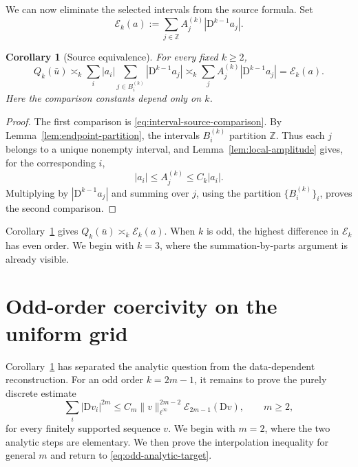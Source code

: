 \documentclass[11pt]{amsart}
\theoremstyle{plain}
\newtheorem{corollary}[theorem]{Corollary}
\theoremstyle{definition}
\theoremstyle{remark}
\numberwithin{equation}{section}
\theoremstyle{plain}
\begin{document}
We can now eliminate the selected intervals from the source formula.  Set
\begin{equation}\label{eq:finite-difference-source-functional}
	\mathcal E_k(a)
	:=\sum_{j\in\mathbb Z}
	A_j^{(k)}|\mathrm D^{k-1}a_j|.
\end{equation}

\begin{corollary}[Source equivalence]
	\label{cor:source-equivalence}
	For every fixed $k\ge2$,
	\begin{equation}\label{eq:source-functional-equivalence}
		Q_k(\bar u)
		\asymp_k
		\sum_i|a_i|\sum_{j\in B_i^{(k)}}
		|\mathrm D^{k-1}a_j|
		\asymp_k
		\sum_j A_j^{(k)}|\mathrm D^{k-1}a_j|
		=\mathcal E_k(a).
	\end{equation}
	Here the comparison constants depend only on $k$.
\end{corollary}

\begin{proof}
	The first comparison is \eqref{eq:interval-source-comparison}.  By
	Lemma~\ref{lem:endpoint-partition}, the intervals $B_i^{(k)}$ partition
	$\mathbb Z$.  Thus each $j$ belongs to a unique nonempty interval, and
	Lemma~\ref{lem:local-amplitude} gives, for the corresponding $i$,
	\[
	|a_i|\le A_j^{(k)}\le C_k|a_i|.
	\]
	Multiplying by $|\mathrm D^{k-1}a_j|$ and summing over $j$, using the
	partition $\{B_i^{(k)}\}_i$, proves the second comparison.
\end{proof}

Corollary~\ref{cor:source-equivalence} gives
$Q_k(\bar u)\asymp_k\mathcal E_k(a)$.  When $k$ is odd, the highest
difference in $\mathcal E_k$ has even order.  We begin with $k=3$, where the
summation-by-parts argument is already visible.


\section{Odd-order coercivity on the uniform grid}
\label{sec:odd-coercivity}

Corollary~\ref{cor:source-equivalence} has separated the analytic question
from the data-dependent reconstruction.  For an odd order $k=2m-1$, it
remains to prove the purely discrete estimate
\begin{equation}\label{eq:odd-analytic-target}
	\sum_i|\mathrm Dv_i|^{2m}
	\le C_m\|v\|_{\ell^\infty}^{2m-2}
	\mathcal E_{2m-1}(\mathrm Dv),
	\qquad m\ge2,
\end{equation}
for every finitely supported sequence $v$.
We begin with $m=2$, where the two analytic steps are elementary.  We
then prove the interpolation inequality for general $m$ and return to
\eqref{eq:odd-analytic-target}.
\end{document}
